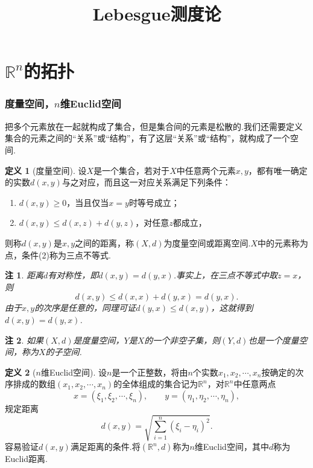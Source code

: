 \documentclass[lang=cn,12pt]{ctexart}
\title{\Huge\textbf{Lebesgue测度论}}
\date{}
\theoremstyle{definition}
\newtheorem{definition}{定义}
\theoremstyle{plain}
\newtheorem*{remark}{注}
\begin{document}
	\maketitle
	\tableofcontents
	
	\newpage
\part{$\mathbb{R}^n$的拓扑}
\section{度量空间，$n$维Euclid空间}
把多个元素放在一起就构成了集合，但是集合间的元素是松散的.我们还需要定义
集合的元素之间的“关系”或“结构”，有了这层“关系”或“结构”，就构成了一个{\heiti 空间}.
\begin{definition}[度量空间]
	设$X$是一个集合，若对于$X$中任意两个元素$x,y$，都有唯一确定的实数$d(x,y)$与之对应，而且这一对应关系满足下列条件：
	\begin{enumerate}
		\item $d(x,y)\geqslant 0$，当且仅当$x=y$时等号成立；
		\item $d(x,y)\leqslant d(x,z)+d(y,z)$，对任意$z$都成立，
	\end{enumerate}
	则称$d(x,y)$是$x,y$之间的{\heiti 距离}，称$(X,d)$为{\heiti 度量空间}或{\heiti 距离空间}.$X$中的元素称为{\heiti 点}，条件(2)称为{\heiti 三点不等式}.
\end{definition}
\begin{remark}
	距离$d$有对称性，即$d(x,y)=d(y,x)$.事实上，在三点不等式中取$z=x$，则
	$$d(x,y)\leqslant d(x,x)+d(y,x)=d(y,x).$$
	由于$x,y$的次序是任意的，同理可证$d(y,x)\leqslant d(x,y)$，这就得到$d(x,y)=d(y,x)$.
\end{remark}
\begin{remark}
	如果$(X,d)$是度量空间，$Y$是$X$的一个非空子集，则$(Y,d)$也是一个度量空间，称为$X$的{\heiti 子空间}.
\end{remark}
\begin{definition}[$n$维Euclid空间]
	设$n$是一个正整数，将由$n$个实数$x_1,x_2,\cdots,x_n$按确定的次序排成的数组$(x_1,x_2,\cdots,x_n)$的全体组成的集合记为$\mathbb{R}^n$，对$\mathbb{R}^n$中任意两点
	$$x=(\xi_1,\xi_2,\cdots,\xi_n),\qquad y=(\eta_1,\eta_2,\cdots,\eta_n),$$
	规定距离
	$$d(x,y)=\sqrt{\sum_{i=1}^{n}(\xi_i-\eta_i)^2}.$$
	容易验证$d(x,y)$满足距离的条件.将$(\mathbb{R}^n,d)$称为{\heiti $n$维Euclid空间}，其中$d$称为{\heiti Euclid距离}.
\end{definition}
\end{document}
